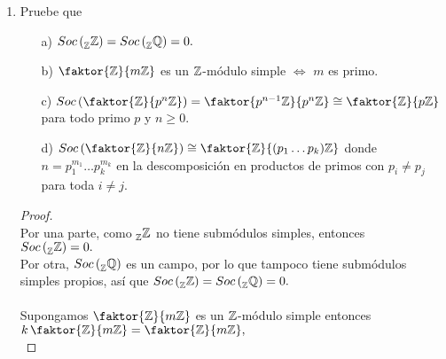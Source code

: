 \documentclass{article}
\begin{document}
\begin{enumerate}[label=\textbf{Ej \arabic*.}]
\begin{proof}
			Finalmente, puesto que $\mathbb{Z}$ es irreducible y que $\mathbb{Z}\subseteq\mathbb{Q}$ es mono-esencial, se satisface la \textbf{Proposición 3.3.7.d)}. $\therefore\mathbb{Q}$ es inyectivo e inescindible.\\
		
			$\boxed{\text{b)}}$ Sea $0 \neq M \leq Q$. Por la \textbf{Proposición 3.3.5.c)}, $I_{0}\lrprth{M}\leq\mathbb{Q}$. Como $I_{0}\lrprth{M}$ es inyectivo, existe $K\leq\mathbb{Q}$ tal que $\mathbb{Q} \cong K \oplus I_{0}\lrprth{M}$. Dado que $\mathbb{Q}$ es inescindible, $K=0$. $\therefore I_{0}\lrprth{M}\cong\mathbb{Q}$
		\end{proof}
		
		\item Pruebe que 
\begin{itemize}
\item[a)] $Soc\left(\prescript{}{\mathbb{Z}}{\mathbb{Z}}\right)=Soc\left(\prescript{}{\mathbb{Z}}{\mathbb{Q}}\right)=0.$
\item[b)] $\faktor{\Z}{m\Z}$ es un $\mathbb{Z}$-módulo simple $\iff$ $m$ es primo.
\item[c)] $Soc\left(\faktor{\Z}{p^n\Z}\right)=\faktor{p^{n-1}\Z}{p^n\Z}\cong \faktor{\Z}{p\Z}$ para todo primo $p$ y $n\geq 0$.
\item[d)] $Soc\left(\faktor{\Z}{n\Z}\right)\cong \faktor{\Z}{(p_1\ldots p_k)\Z}$ donde $n=p_1^{m_1}\ldots p_k^{m_k}$ en la descomposición
en productos de primos con $p_i\neq p_j$ para toda $i\neq j$.
\end{itemize}
\begin{proof}\\
Por una parte, como $\prescript{}{\mathbb{Z}}{\mathbb{Z}}$ no tiene submódulos simples, entonces\\ $Soc\left(\prescript{}{\mathbb{Z}}{\mathbb{Z}}\right)=0.$\\
Por otra, $Soc\left(\prescript{}{\mathbb{Z}}{\mathbb{Q}}\right)$ es un campo, por lo que tampoco tiene submódulos simples propios, así que 
 $Soc\left(\prescript{}{\mathbb{Z}}{\mathbb{Z}}\right)=Soc\left(\prescript{}{\mathbb{Z}}{\mathbb{Q}}\right)=0.$\\
\\
Supongamos $\faktor{\Z}{m\Z}$ es un $\mathbb{Z}$-módulo simple entonces $k\,\faktor{\Z}{m\Z}=\faktor{\Z}{m\Z},$\\


\end{proof}
\end{enumerate}
\end{document}
